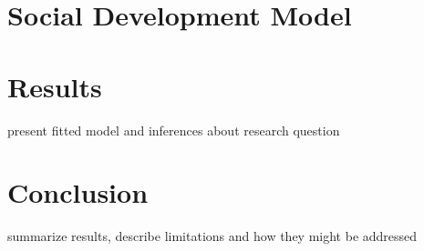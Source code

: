 \documentclass[12pt]{article}
\begin{document}
\section{Social Development Model}



\section{Results}
present fitted model and inferences about research question



\section{Conclusion}
summarize results, describe limitations and how they might be addressed



\theendnotes
\end{document}
